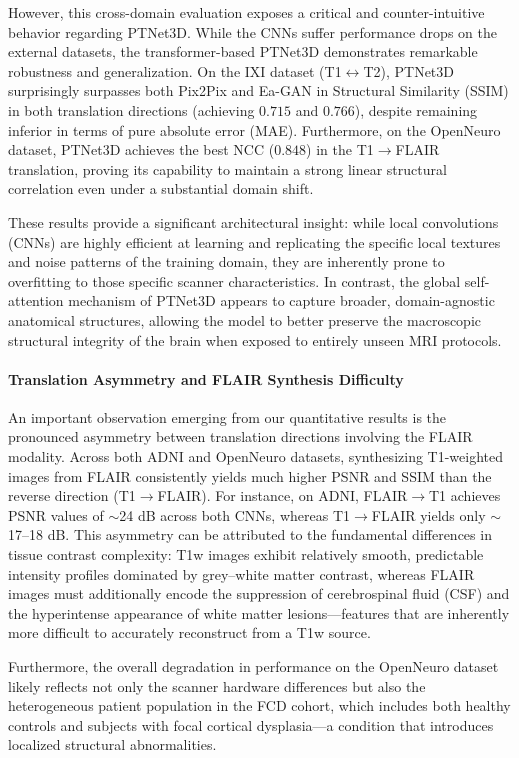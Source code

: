 \documentclass[11pt,a4paper]{article}
\begin{document}
However, this cross-domain evaluation exposes a critical and counter-intuitive behavior regarding PTNet3D. While the CNNs suffer performance drops on the external datasets, the transformer-based PTNet3D demonstrates remarkable robustness and generalization. On the IXI dataset (T1$\leftrightarrow$T2), PTNet3D surprisingly surpasses both Pix2Pix and Ea-GAN in Structural Similarity (SSIM) in both translation directions (achieving $0.715$ and $0.766$), despite remaining inferior in terms of pure absolute error (MAE). Furthermore, on the OpenNeuro dataset, PTNet3D achieves the best NCC ($0.848$) in the T1$\rightarrow$FLAIR translation, proving its capability to maintain a strong linear structural correlation even under a substantial domain shift. 

These results provide a significant architectural insight: while local convolutions (CNNs) are highly efficient at learning and replicating the specific local textures and noise patterns of the training domain, they are inherently prone to overfitting to those specific scanner characteristics. In contrast, the global self-attention mechanism of PTNet3D appears to capture broader, domain-agnostic anatomical structures, allowing the model to better preserve the macroscopic structural integrity of the brain when exposed to entirely unseen MRI protocols.

\paragraph{Translation Asymmetry and FLAIR Synthesis Difficulty}
An important observation emerging from our quantitative results is the pronounced asymmetry between translation directions involving the FLAIR modality. Across both ADNI and OpenNeuro datasets, synthesizing T1-weighted images from FLAIR consistently yields much higher PSNR and SSIM than the reverse direction (T1$\rightarrow$FLAIR). For instance, on ADNI, FLAIR$\rightarrow$T1 achieves PSNR values of $\sim$24 dB across both CNNs, whereas T1$\rightarrow$FLAIR yields only $\sim$17--18 dB. This asymmetry can be attributed to the fundamental differences in tissue contrast complexity: T1w images exhibit relatively smooth, predictable intensity profiles dominated by grey--white matter contrast, whereas FLAIR images must additionally encode the suppression of cerebrospinal fluid (CSF) and the hyperintense appearance of white matter lesions---features that are inherently more difficult to accurately reconstruct from a T1w source.

Furthermore, the overall degradation in performance on the OpenNeuro dataset likely reflects not only the scanner hardware differences but also the heterogeneous patient population in the FCD cohort, which includes both healthy controls and subjects with focal cortical dysplasia---a condition that introduces localized structural abnormalities.
\end{document}
